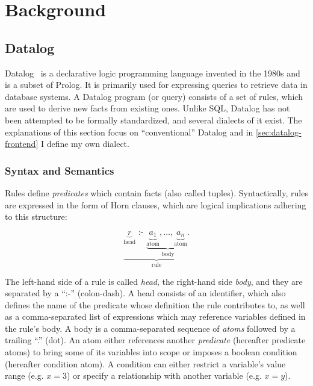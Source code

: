 
\chapter{Background}\label{ch:background}

\section{Datalog}\label{sec:datalog}

Datalog~\cite{green2013datalog} is a declarative logic programming language
invented in the 1980s and is a subset of Prolog.
It is primarily used for expressing queries to retrieve data in database systems.
A Datalog program (or query) consists of a set of rules,
which are used to derive new facts from existing ones.
Unlike SQL, Datalog has not been attempted to be formally standardized,
and several dialects of it exist.
The explanations of this section focus on ``conventional'' Datalog
and in \ref{sec:datalog-frontend} I define my own dialect.

\subsection{Syntax and Semantics}\label{sec:datalog-syntax-semantics}

Rules define \emph{predicates} which contain facts (also called tuples).
Syntactically, rules are expressed in the form of Horn clauses,
which are logical implications adhering to this structure:

\begin{equation}
	\underbrace{
	\underbrace{r}_{\text{head}}
	\text{ :- }
	\underbrace{
	\underbrace{a_1}_{\text{atom}},
	\ldots,
	\underbrace{a_n}_{\text{atom}}.
	}_{\text{body}}
	}_{\text{rule}}
\end{equation}

The left-hand side of a rule is called \emph{head}, the right-hand side \emph{body},
and they are separated by a ``:-'' (colon-dash).
A head consists of an identifier, which also defines the name of the predicate
whose definition the rule contributes to, as well as a comma-separated list of expressions
which may reference variables defined in the rule's body.
A body is a comma-separated sequence of \emph{atoms} followed by a trailing ``.'' (dot).
An atom either references another \emph{predicate} (hereafter predicate atoms)
to bring some of its variables into scope or imposes a boolean condition
(hereafter condition atom).
A condition can either restrict a variable's value range (e.g. \(x = 3\))
or specify a relationship with another variable (e.g. \(x = y\)).

